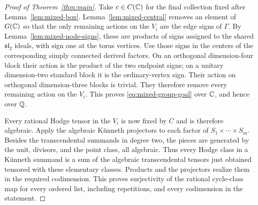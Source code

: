 \begin{proof}[Proof of Theorem~\ref{thm:main}]
Take $c\in C(\mathbb C)$ for the final collection fixed after
Lemma~\ref{lem:mixed-box}.  Lemma~\ref{lem:mixed-central} removes
an element of $G(\mathbb C)$ so that the only remaining actions on the
$V_i$ are the edge signs of $\Gamma$.  By
Lemma~\ref{lem:mixed-node-signs}, these are products of signs
assigned to the shared $\mathfrak{sl}_2$ ideals, with sign one at
the torus vertices.  Use those signs in the centers of the
corresponding simply connected derived factors.  On an orthogonal
dimension-four block their action is the product of the two
endpoint signs; on a unitary dimension-two standard block it is
the ordinary-vertex sign.  Their action on orthogonal
dimension-three blocks is trivial.  They therefore remove every
remaining action on the $V_i$.  This proves
\eqref{eq:mixed-group-goal} over $\mathbb C$, and hence over $\mathbb Q$.

Every rational Hodge tensor in the $V_i$ is now fixed by $C$ and
is therefore algebraic.  Apply the algebraic K\"unneth projectors
to each factor of $S_1\times\cdots\times S_m$.  Besides the
transcendental summands in degree two, the pieces are generated by
the unit, divisors, and the point class, all algebraic.  Thus every
Hodge class in a K\"unneth summand is a sum of the algebraic
transcendental tensors just obtained tensored with these elementary
classes.  Products and the projectors realize them in the required
codimension.  This proves surjectivity of the rational cycle-class
map for every ordered list, including repetitions, and every
codimension in the statement.
\end{proof}
